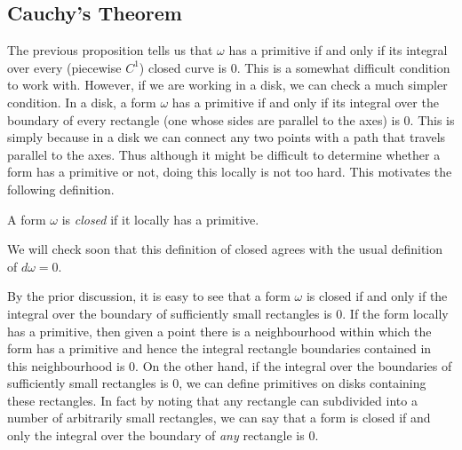 \subsection{Cauchy's Theorem}
The previous proposition tells us that $\omega$ has a primitive if and only if its integral over every (piecewise $C^1$) closed curve is 0. This is a somewhat difficult condition to work with. However, if we are working in a disk, we can check a much simpler condition. In a disk, a form $\omega$ has a primitive if and only if its integral over the boundary of every rectangle (one whose sides are parallel to the axes) is 0. This is simply because in a disk we can connect any two points with a path that travels parallel to the axes. Thus although it might be difficult to determine whether a form has a primitive or not, doing this locally is not too hard. This motivates the following definition.

\begin{definition}
A form $\omega$ is \textit{closed} if it locally has a primitive.
\end{definition}
\begin{remark}
We will check soon that this definition of closed agrees with the usual definition of $d\omega = 0$.
\end{remark}
By the prior discussion, it is easy to see that a form $\omega$ is closed if and only if the integral over the boundary of sufficiently small rectangles is 0. If the form locally has a primitive, then given a point there is a neighbourhood within which the form has a primitive and hence the integral rectangle boundaries contained in this neighbourhood is 0. On the other hand, if the integral over the boundaries of sufficiently small rectangles is 0, we can define primitives on disks containing these rectangles. In fact by noting that any rectangle can subdivided into a number of arbitrarily small rectangles, we can say that a form is closed if and only the integral over the boundary of \textit{any} rectangle is 0.

